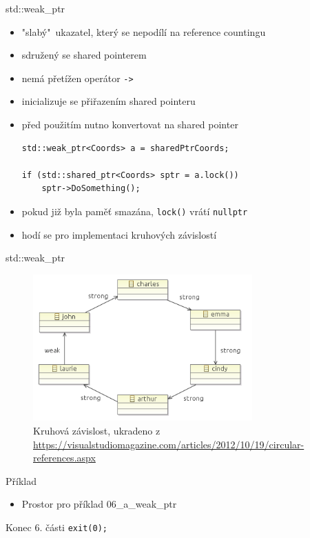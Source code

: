 \documentclass{beamer}
\begin{document}
\begin{xframe}{std::weak\_ptr}
	\begin{itemize}
		\item "slabý"~ukazatel, který se nepodílí na reference countingu
		\item sdružený se shared pointerem
		\item \alert{nemá} přetížen operátor \texttt{->}
		\item inicializuje se přiřazením shared pointeru
		\item před použitím nutno konvertovat na shared pointer
\begin{lstlisting}[basicstyle=\fontsize{8}{9}\selectfont\ttfamily]
std::weak_ptr<Coords> a = sharedPtrCoords;

if (std::shared_ptr<Coords> sptr = a.lock())
    sptr->DoSomething();
\end{lstlisting}
		\item pokud již byla paměť smazána, \texttt{lock()} vrátí \texttt{nullptr}
		\item hodí se pro implementaci kruhových závislostí
	\end{itemize}
\end{xframe}

\begin{xframe}{std::weak\_ptr}
	\begin{figure}
		\centering
		\includegraphics[width=0.75\textwidth]{sharedweakcircle.png}
		\caption{Kruhová závislost, ukradeno z \url{https://visualstudiomagazine.com/articles/2012/10/19/circular-references.aspx}}
	\end{figure}
\end{xframe}

\begin{xframe}{Příklad}
	\begin{itemize}
		\item Prostor pro příklad 06\_a\_weak\_ptr
	\end{itemize}
\end{xframe}




\begin{xframe}{Konec 6. části}
\texttt{exit(0);}
\end{xframe}
\end{document}
